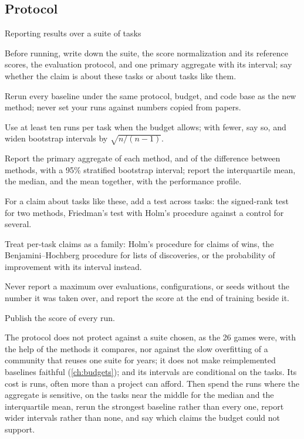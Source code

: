 \begin{refsection}
\section{Protocol}\label{sec:aggregates:protocol}

\begin{protocol}{Reporting results over a suite of tasks}\label{prot:aggregates:suite}
\item Before running, write down the suite, the score normalization and its reference scores, the evaluation protocol, and one primary aggregate with its interval; say whether the claim is about these tasks or about tasks like them.
\item Rerun every baseline under the same protocol, budget, and code base as the new method; never set your runs against numbers copied from papers.
\item Use at least ten runs per task when the budget allows; with fewer, say so, and widen bootstrap intervals by $\sqrt{n/(n-1)}$.
\item Report the primary aggregate of each method, and of the difference between methods, with a 95\% stratified bootstrap interval; report the interquartile mean, the median, and the mean together, with the performance profile.
\item For a claim about tasks like these, add a test across tasks: the signed-rank test for two methods, Friedman's test with Holm's procedure against a control for several.
\item Treat per-task claims as a family: Holm's procedure for claims of wins, the Benjamini--Hochberg procedure for lists of discoveries, or the probability of improvement with its interval instead.
\item Never report a maximum over evaluations, configurations, or seeds without the number it was taken over, and report the score at the end of training beside it.
\item Publish the score of every run.
\end{protocol}

The protocol does not protect against a suite chosen, as the 26 games were, with the help of the methods it compares, nor against the slow overfitting of a community that reuses one suite for years; it does not make reimplemented baselines faithful (\cref{ch:budgets}); and its intervals are conditional on the tasks. Its cost is runs, often more than a project can afford. Then spend the runs where the aggregate is sensitive, on the tasks near the middle for the median and the interquartile mean, rerun the strongest baseline rather than every one, report wider intervals rather than none, and say which claims the budget could not support.


\end{refsection}
